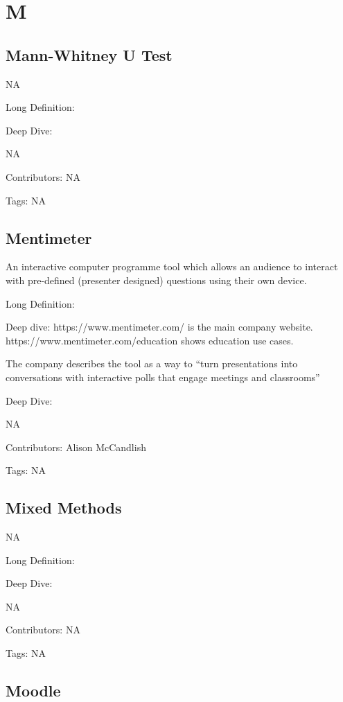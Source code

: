\documentclass[
  letterpaper,
  DIV=11,
  numbers=noendperiod]{scrreprt}
\begin{document}

\chapter{M}\label{m}

\section{Mann-Whitney U Test}\label{mann-whitney-u-test}

NA

Long Definition:

Deep Dive:

NA

Contributors: NA

Tags: NA

\section{Mentimeter}\label{mentimeter}

An interactive computer programme tool which allows an audience to
interact with pre-defined (presenter designed) questions using their own
device.

Long Definition:

Deep dive: https://www.mentimeter.com/ is the main company website.
https://www.mentimeter.com/education shows education use cases.

The company describes the tool as a way to ``turn presentations into
conversations with interactive polls that engage meetings and
classrooms''

Deep Dive:

NA

Contributors: Alison McCandlish

Tags: NA

\section{Mixed Methods}\label{mixed-methods}

NA

Long Definition:

Deep Dive:

NA

Contributors: NA

Tags: NA

\section{Moodle}\label{moodle}
\end{document}
